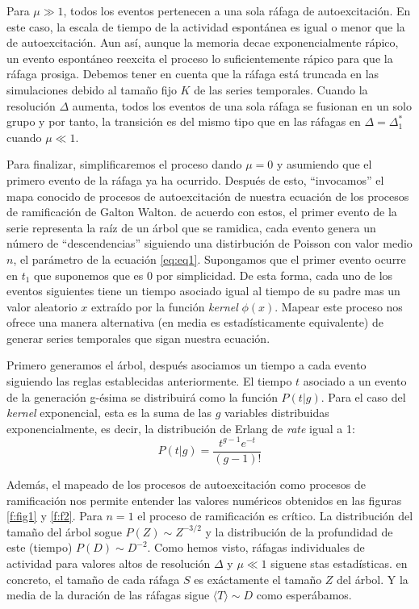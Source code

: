 \documentclass[a4paper,11pt]{book}
\begin{document}
Para $\mu\gg1$, todos los eventos pertenecen a una sola ráfaga de autoexcitación. En este caso, la escala de tiempo de la actividad espontánea es 
igual o menor que la de autoexcitación. Aun así, aunque la memoria decae exponencialmente rápico, un evento espontáneo reexcita el proceso lo 
suficientemente rápico para que la ráfaga prosiga. Debemos tener en cuenta que la ráfaga está truncada en las simulaciones debido al tamaño fijo 
$K$ de las series temporales. Cuando la resolución $\Delta$ aumenta, todos los eventos de una sola ráfaga se fusionan en un solo grupo y por tanto,
la transición es del mismo tipo que en las ráfagas en $\Delta=\Delta^*_1$ cuando $\mu\ll1$.

Para finalizar, simplificaremos el proceso dando $\mu=0$ y asumiendo que el primero evento de la ráfaga ya ha ocurrido. Después de esto, ``invocamos'' 
el mapa conocido de procesos de autoexcitación de nuestra ecuación de los procesos de ramificación de Galton Walton. de acuerdo con estos, el primer 
evento de la serie representa la raíz de un árbol que se ramidica, cada evento genera un número de ``descendencias'' siguiendo una distirbución de 
Poisson con valor medio $n$, el parámetro de la ecuación \ref{eq:eq1}. Supongamos que el primer evento ocurre en $t_1$ que suponemos que es $0$ por 
simplicidad. De esta forma, cada uno de los eventos siguientes tiene un tiempo asociado igual al tiempo de su padre mas un valor aleatorio $x$ extraído 
por la función \textit{kernel} $\phi(x)$. Mapear este proceso nos ofrece una manera alternativa (en media es estadísticamente equivalente) de 
generar series temporales que sigan nuestra ecuación.

Primero generamos el árbol, después asociamos un tiempo a cada evento siguiendo las reglas establecidas anteriormente. El tiempo $t$ asociado 
a un evento de la generación g-ésima se distribuirá como la función $P(t\Big|g)$. Para el caso del \textit{kernel} exponencial, esta es la 
suma de las $g$ variables distribuidas exponencialmente, es decir, la distribución de Erlang de \textit{rate} igual a 1:
$$P(t|g)=\dfrac{t^{g-1}e^{-t}}{(g-1)!}$$

Además, el mapeado de los procesos de autoexcitación como procesos de ramificación nos permite entender las valores numéricos obtenidos en las 
figuras \ref{f:fig1} y \ref{f:f2}. Para $n=1$ el proceso de ramificación es crítico. La distribución del tamaño del árbol sogue $P(Z)\sim Z^{-3/2}$ 
y la distribución de la profundidad de este (tiempo) $P(D)\sim D^{-2}$. Como hemos visto, ráfagas individuales de actividad para valores altos de 
resolución $\Delta$ y $\mu\ll1$ siguene stas estadísticas. en concreto, el tamaño de cada ráfaga $S$ es exáctamente el tamaño $Z$ del árbol. Y la 
media de la duración de las ráfagas sigue $\langle T\rangle\sim D$ como esperábamos.
\end{document}
